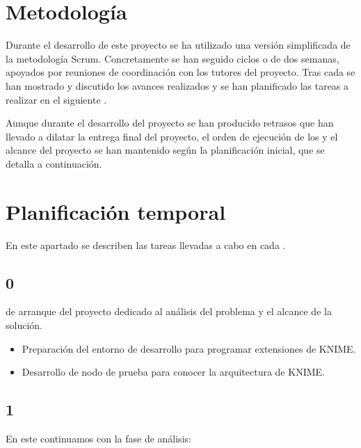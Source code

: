 \label{sec:appendixA}

\section{Metodología}

Durante el desarrollo de este proyecto se ha utilizado una versión simplificada de la metodología Scrum. Concretamente se han
seguido ciclos o  de dos semanas, apoyados por reuniones de coordinación con los tutores del proyecto. Tras cada  se 
han mostrado y discutido los avances realizados y se han planificado las tareas a realizar en el siguiente . 
\

Aunque durante el desarrollo del proyecto se han producido retrasos que han llevado a dilatar la 
entrega final del proyecto, el orden de ejecución de los  y el alcance del proyecto se han 
mantenido según la planificación inicial, que se detalla a continuación. 


\section{Planificación temporal}

En este apartado se describen las tareas llevadas a cabo en cada . 

\subsection{ 0}

 de arranque del proyecto dedicado al análisis del problema y el alcance de la solución. 

\begin{itemize}
	\item Preparación del entorno de desarrollo para programar extensiones de KNIME.
	\item Desarrollo de nodo de prueba para conocer la arquitectura de KNIME.
\end{itemize}


\subsection{ 1}

En este  continuamos con la fase de análisis: 

